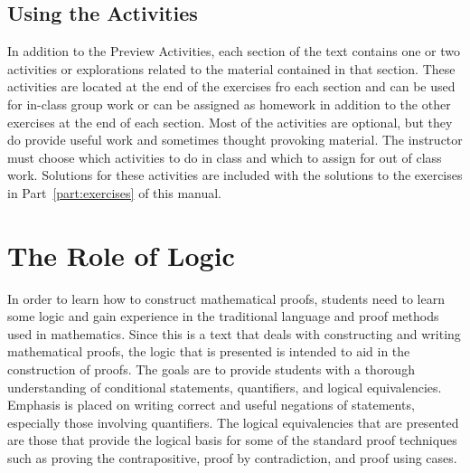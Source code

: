 
\subsection*{Using the Activities}

In addition to the Preview Activities, each section of the text contains one or two activities or explorations related to the material contained in that section.  These activities are located at the end of the exercises fro each section and can be used for in-class group work or can be assigned as homework in addition to the other exercises at the end of each section.  Most of the activities are optional, but they do provide useful work and sometimes thought provoking material.  The instructor must choose which activities to do in class and which to assign for out of class work.  Solutions for these activities are included with the solutions to the exercises in Part~\ref{part:exercises} of this manual.
\hbreak



\section*{The Role of Logic}

In order to learn how to construct mathematical proofs, students need to learn some logic and gain experience in the traditional language and proof methods used in mathematics.  Since this is a text that deals with constructing and writing mathematical proofs, the logic that is presented is intended to aid in the construction of proofs.  The goals are to provide students with a thorough understanding of conditional statements, quantifiers, and logical equivalencies.  Emphasis is placed on writing correct and useful negations of statements, especially those involving quantifiers.  The logical equivalencies that are presented are those that provide the logical basis for some of the standard proof techniques such as proving the contrapositive, proof by contradiction, and proof using cases.
\hbreak

